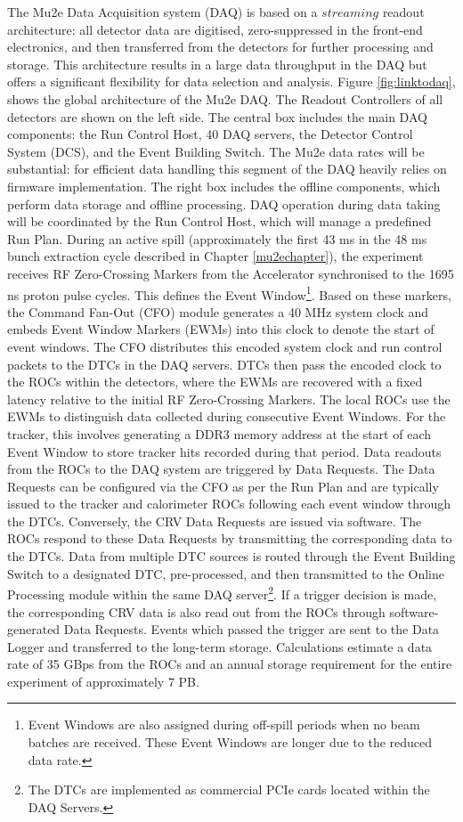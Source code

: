 The Mu2e Data Acquisition system (DAQ) is based on a $streaming$ readout architecture: 
all detector data are digitised, zero-suppressed in the 
front-end electronics,
and then transferred from the detectors for further 
processing and storage. 
This architecture results in a large data throughput in 
the DAQ but offers a 
significant flexibility for data selection and analysis. 
Figure \ref{fig:linktodaq}\cite{GIOIOSA2023167732}, 
shows the global 
architecture of the Mu2e DAQ. 
The Readout Controllers of all detectors are shown 
on the left side. The central box includes the main DAQ 
components: the Run Control Host, 40 DAQ servers, the 
Detector Control System (DCS), and the Event Building 
Switch. The Mu2e data rates will be substantial: for 
efficient data handling this segment of the DAQ heavily 
relies on firmware implementation. The right box includes 
the offline components, which perform data storage and 
offline processing. DAQ operation during data taking will be coordinated by the Run Control Host, 
which will manage a predefined Run Plan. During an active spill (approximately the first 
43 ms in the 48 ms bunch extraction cycle described in Chapter \ref{mu2echapter}), 
the experiment receives RF Zero-Crossing Markers from the Accelerator 
synchronised to the 1695 ns proton pulse cycles. This defines the 
Event Window\footnote{Event Windows are also assigned during off-spill periods 
when no beam batches are received. 
These Event Windows are longer due to the reduced data rate.}. 
Based on these markers, the Command Fan-Out (CFO) module 
generates a 40 MHz system clock and embeds Event 
Window Markers (EWMs) into this clock to denote the start of event 
windows. The CFO distributes this encoded system clock and run control 
packets to the DTCs in the DAQ servers. 
DTCs then pass the encoded clock to the ROCs within the detectors, 
where the EWMs are recovered with a fixed latency relative to the 
initial RF Zero-Crossing Markers. The local ROCs use the EWMs to distinguish 
data collected during consecutive Event Windows. For the tracker, 
this involves generating a DDR3 memory address at the start of each 
Event Window to store tracker hits recorded during that period. 
Data readouts from the ROCs to the DAQ system are triggered by Data Requests. 
The Data Requests can be configured via the CFO as per the Run Plan and are 
typically issued to the tracker and calorimeter ROCs following each event 
window through the DTCs. Conversely, the CRV Data Requests are issued via 
software. The ROCs respond to these Data Requests by transmitting the 
corresponding data to the DTCs. Data from multiple DTC sources is routed 
through the Event Building Switch to a designated DTC, pre-processed, and 
then transmitted to the Online Processing module within the same DAQ 
server\footnote{The DTCs are implemented as commercial PCIe cards located 
within the DAQ Servers.}. If a trigger decision is made, the corresponding 
CRV data is also read out from the ROCs through software-generated Data 
Requests. Events which passed the trigger are sent to the Data Logger 
and transferred to the long-term storage. Calculations estimate a data rate of 35 GBps 
from the ROCs and an annual storage requirement for the entire experiment of 
approximately 7 PB. 


